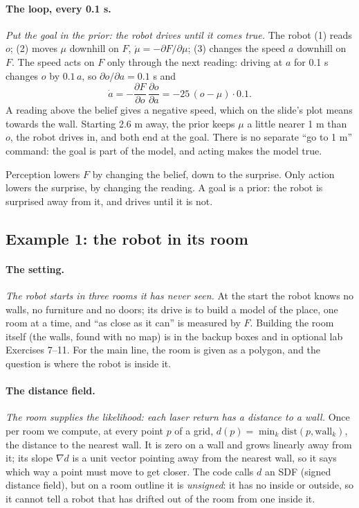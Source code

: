 \documentclass[11pt]{article}
\newcommand{\slt}[1]{\emph{#1}}   %
\begin{document}
\paragraph{The loop, every 0.1 s.} \slt{Put the goal in the prior: the robot drives until it comes true.} The robot (1) reads $o$; (2) moves $\mu$ downhill on $F$, $\dot\mu=-\partial F/\partial\mu$; (3) changes the speed $a$ downhill on $F$. The speed acts on $F$ only through the next reading: driving at $a$ for 0.1 s changes $o$ by $0.1\,a$, so $\partial o/\partial a=0.1$ s and
\[
\dot a=-\frac{\partial F}{\partial o}\,\frac{\partial o}{\partial a}=-25\,(o-\mu)\cdot 0.1 .
\]
A reading above the belief gives a negative speed, which on the slide's plot means towards the wall. Starting 2.6 m away, the prior keeps $\mu$ a little nearer 1 m than $o$, the robot drives in, and both end at the goal. There is no separate ``go to 1 m'' command: the goal is part of the model, and acting makes the model true.

\begin{keyidea}
Perception lowers $F$ by changing the belief, down to the surprise. Only action lowers the surprise, by changing the reading. A goal is a prior: the robot is surprised away from it, and drives until it is not.
\end{keyidea}

\subsection{Example 1: the robot in its room}

\paragraph{The setting.} \slt{The robot starts in three rooms it has never seen.} At the start the robot knows no walls, no furniture and no doors; its drive is to build a model of the place, one room at a time, and ``as close as it can'' is measured by $F$. Building the room itself (the walls, found with no map) is in the backup boxes and in optional lab Exercises 7--11. For the main line, the room is given as a polygon, and the question is where the robot is inside it.

\paragraph{The distance field.} \slt{The room supplies the likelihood: each laser return has a distance to a wall.} Once per room we compute, at every point $p$ of a grid, $d(p)=\min_k \mathrm{dist}(p,\text{wall}_k)$, the distance to the nearest wall. It is zero on a wall and grows linearly away from it; its slope $\nabla d$ is a unit vector pointing away from the nearest wall, so it says which way a point must move to get closer. The code calls $d$ an SDF (signed distance field), but on a room outline it is \emph{unsigned}: it has no inside or outside, so it cannot tell a robot that has drifted out of the room from one inside it.
\end{document}
